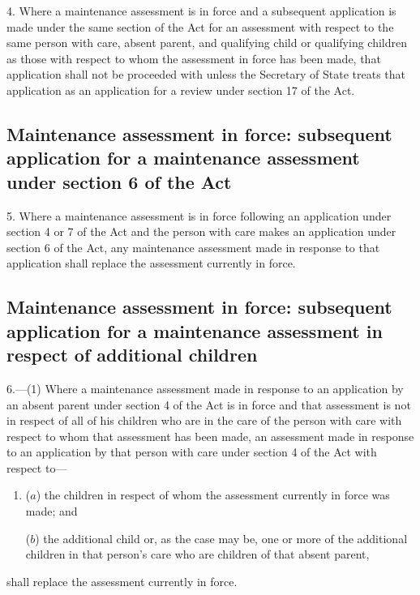 \documentclass[a4paper]{article}
\begin{document}
4.  Where a maintenance assessment is in force and a subsequent application is made under the same section of the Act for an assessment with respect to the same person with care, absent parent, and qualifying child or qualifying children as those with respect to whom the assessment in force has been made, that application shall not be proceeded with unless the Secretary of State treats that application as an application for a review under section 17 of the Act.

\subsection*{Maintenance assessment in force: subsequent application for a maintenance assessment under section 6 of the Act}

5.  Where a maintenance assessment is in force following an application under section 4 or 7 of the Act and the person with care makes an application under section 6 of the Act, any maintenance assessment made in response to that application shall replace the assessment currently in force.

\subsection*{Maintenance assessment in force: subsequent application for a maintenance assessment in respect of additional children}

6.—(1) Where a maintenance assessment made in response to an application by an absent parent under section 4 of the Act is in force and that assessment is not in respect of all of his children who are in the care of the person with care with respect to whom that assessment has been made, an assessment made in response to an application by that person with care under section 4 of the Act with respect to—
\begin{enumerate}\item[]
($a$) the children in respect of whom the assessment currently in force was made; and

($b$) the additional child or, as the case may be, one or more of the additional children in that person’s care who are children of that absent parent,
\end{enumerate}
shall replace the assessment currently in force.
\end{document}
